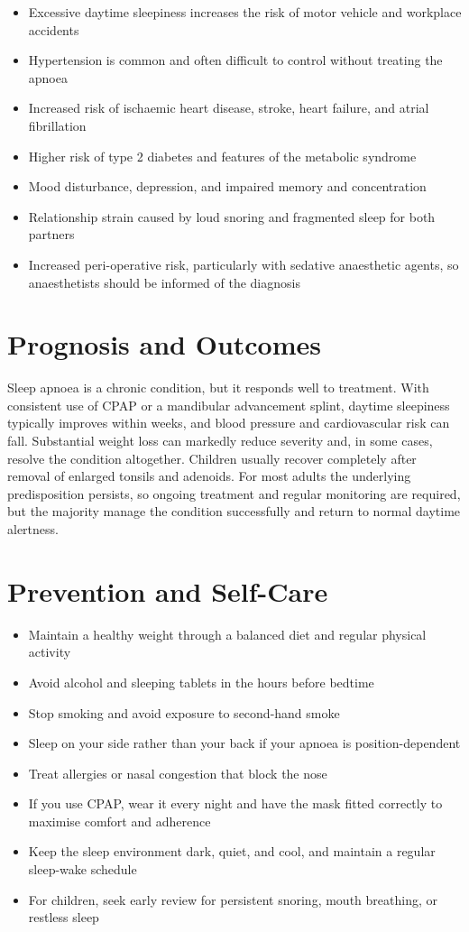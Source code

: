 \begin{itemize}
    \item Excessive daytime sleepiness increases the risk of motor vehicle and workplace accidents
    \item Hypertension is common and often difficult to control without treating the apnoea
    \item Increased risk of ischaemic heart disease, stroke, heart failure, and atrial fibrillation
    \item Higher risk of type 2 diabetes and features of the metabolic syndrome
    \item Mood disturbance, depression, and impaired memory and concentration
    \item Relationship strain caused by loud snoring and fragmented sleep for both partners
    \item Increased peri-operative risk, particularly with sedative anaesthetic agents, so anaesthetists should be informed of the diagnosis
\end{itemize}

\section*{Prognosis and Outcomes}
Sleep apnoea is a chronic condition, but it responds well to treatment. With consistent use of CPAP or a mandibular advancement splint, daytime sleepiness typically improves within weeks, and blood pressure and cardiovascular risk can fall. Substantial weight loss can markedly reduce severity and, in some cases, resolve the condition altogether. Children usually recover completely after removal of enlarged tonsils and adenoids. For most adults the underlying predisposition persists, so ongoing treatment and regular monitoring are required, but the majority manage the condition successfully and return to normal daytime alertness.

\section*{Prevention and Self-Care}
\begin{itemize}
    \item Maintain a healthy weight through a balanced diet and regular physical activity
    \item Avoid alcohol and sleeping tablets in the hours before bedtime
    \item Stop smoking and avoid exposure to second-hand smoke
    \item Sleep on your side rather than your back if your apnoea is position-dependent
    \item Treat allergies or nasal congestion that block the nose
    \item If you use CPAP, wear it every night and have the mask fitted correctly to maximise comfort and adherence
    \item Keep the sleep environment dark, quiet, and cool, and maintain a regular sleep-wake schedule
    \item For children, seek early review for persistent snoring, mouth breathing, or restless sleep
\end{itemize}

